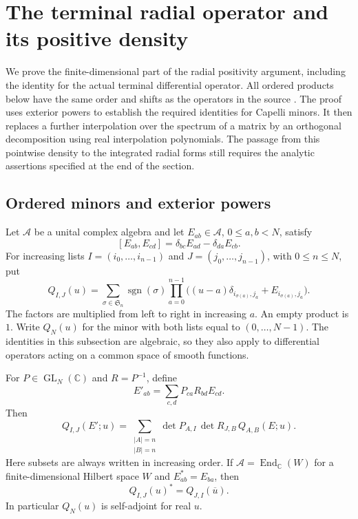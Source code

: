 \section{The terminal radial operator and its positive density}
\label{rp-section}

We prove the finite-dimensional part of the radial positivity
argument, including the identity for the actual terminal
differential operator.  All ordered products below have the
same order and shifts as the operators in the source
\cite{alpo-uniform-source}.  The proof uses exterior powers
to establish the required identities for Capelli minors.
It then replaces a further interpolation over the spectrum
of a matrix by an orthogonal decomposition using real
interpolation polynomials.  The passage from this pointwise
density to the integrated radial forms still requires the
analytic assertions specified at the end of the section.

\subsection{Ordered minors and exterior powers}

Let $\mathcal A$ be a unital complex algebra and let
$E_{ab}\in\mathcal A$, $0\leq a,b<N$, satisfy
\begin{equation}\label{rp-gl}
 [E_{ab},E_{cd}]=\delta_{bc}E_{ad}-\delta_{da}E_{cb}.
\end{equation}
For increasing lists $I=(i_0,\ldots,i_{n-1})$ and
$J=(j_0,\ldots,j_{n-1})$, with $0\leq n\leq N$, put
\begin{equation}\label{rp-minor}
 Q_{I,J}(u)=
 \sum_{\sigma\in\mathfrak S_n}\operatorname{sgn}(\sigma)
 \prod_{a=0}^{n-1}
 \bigl((u-a)\delta_{i_{\sigma(a)},j_a}
                  +E_{i_{\sigma(a)},j_a}\bigr).
\end{equation}
The factors are multiplied from left to right in increasing
$a$.  An empty product is $1$.  Write $Q_N(u)$ for the
minor with both lists equal to $(0,\ldots,N-1)$.
The identities in this subsection are algebraic, so they
also apply to differential operators acting on a common
space of smooth functions.

\begin{lemma}\label{rp-capelli}
For $P\in\operatorname{GL}_N(\mathbb C)$ and $R=P^{-1}$,
define
\[
 E'_{ab}=\sum_{c,d}P_{ca}R_{bd}E_{cd}.
\]
Then
\begin{equation}\label{rp-minor-covariance}
 Q_{I,J}(E';u)=
 \sum_{\substack{|A|=n\\|B|=n}}
       \det P_{A,I}\,\det R_{J,B}\,Q_{A,B}(E;u).
\end{equation}
Here subsets are always written in increasing order.
If $\mathcal A=\operatorname{End}_{\mathbb C}(W)$ for a
finite-dimensional Hilbert space $W$ and
$E_{ab}^*=E_{ba}$, then
\begin{equation}\label{rp-minor-adjoint}
                      Q_{I,J}(u)^*=Q_{J,I}(\overline u).
\end{equation}
In particular $Q_N(u)$ is self-adjoint for real $u$.
\end{lemma}

